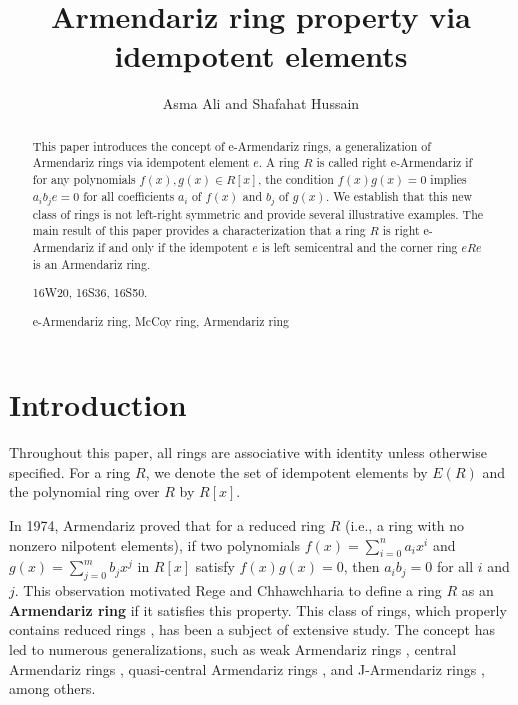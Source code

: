 \documentclass[12pt]{amsart}
\theoremstyle{plain}
\theoremstyle{definition}
\theoremstyle{remark}
\numberwithin{equation}{section}
\begin{document}
	
	
	\thispagestyle{empty}
	
	\title[Armendariz ring property via idempotent elements]{Armendariz ring property via idempotent elements}
	\author{Asma Ali and Shafahat Hussain}
	\address{Asma Ali, Department of Mathematics, Aligarh Muslim University, Aligarh-202002, India}
	\address{Shafahat Hussain, Department of Mathematics, Aligarh Muslim University, Aligarh-202002, India}
	
	
	
	\maketitle
	\begin{abstract} This paper introduces the concept of e-Armendariz rings, a generalization of Armendariz rings via idempotent element $e$. A ring $R$ is called right e-Armendariz if for any polynomials $f(x), g(x) \in R[x]$, the condition $f(x)g(x)=0$ implies $a_ib_je=0$ for all coefficients $a_i$ of $f(x)$ and $b_j$ of $g(x)$. We establish that this new class of rings is not left-right symmetric and provide several illustrative examples. The main result of this paper provides a characterization that a ring $R$ is right e-Armendariz if and only if the idempotent $e$ is left semicentral and the corner ring $eRe$ is an Armendariz ring. %
		\vspace{0.3cm}
		
		  16W20, 16S36, 16S50.
		
		  e-Armendariz ring, McCoy ring, Armendariz ring
	\end{abstract}	
\section{\textbf{Introduction}}
Throughout this paper, all rings are associative with identity unless otherwise specified. For a ring $R$, we denote the set of idempotent elements by $E(R)$ and the polynomial ring over $R$ by $R[x]$.

In 1974, Armendariz \cite{Armendariz} proved that for a reduced ring $R$ (i.e., a ring with no nonzero nilpotent elements), if two polynomials $f(x) = \sum_{i=0}^{n} a_i x^i$ and $g(x) = \sum_{j=0}^{m} b_j x^j$ in $R[x]$ satisfy $f(x)g(x) = 0$, then $a_i b_j = 0$ for all $i$ and $j$. This observation motivated Rege and Chhawchharia \cite{R13} to define a ring $R$ as an \textbf{Armendariz ring} if it satisfies this property. This class of rings, which properly contains reduced rings \cite{R6}, has been a subject of extensive study. The concept has led to numerous generalizations, such as weak Armendariz rings \cite{R11}, central Armendariz rings \cite{R1}, quasi-central Armendariz rings \cite{R10}, and J-Armendariz rings \cite{R14}, among others.
\end{document}
